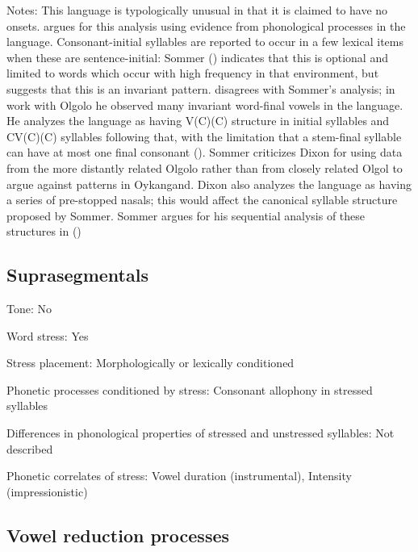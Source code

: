 {\begin{appendixdesc}
\item[Notes:] This language is typologically unusual in that it is claimed to have no onsets. \citet{Sommer1970,Sommer1981} argues for this analysis using evidence from phonological processes in the language. Consonant-initial syllables are reported to occur in a few lexical items when these are sentence-initial: Sommer (\citeyear[16, 33]{Sommer1969}) indicates that this is optional and limited to words which occur with high frequency in that environment, but \citet{Sommer1981} suggests that this is an invariant pattern. \citet{Dixon1970} disagrees with Sommer’s analysis; in work with Olgolo he observed many invariant word-final vowels in the language. He analyzes the language as having V(C)(C) structure in initial syllables and CV(C)(C) syllables following that, with the limitation that a stem-final syllable can have at most one final consonant (\citeyear[274]{Dixon1970}). Sommer criticizes Dixon for using data from the more distantly related Olgolo rather than from closely related Olgol to argue against patterns in Oykangand. Dixon also analyzes the language as having a series of pre-stopped nasals; this would affect the canonical syllable structure proposed by Sommer. Sommer argues for his sequential analysis of these structures in (\citeyear[242 f1]{Sommer1981})
\end{appendixdesc}
\subsection*{Suprasegmentals}
\begin{appendixdesc}
\item[Tone:] No

\item[Word stress:] Yes

\item[Stress placement:] Morphologically or lexically conditioned

\item[Phonetic processes conditioned by stress:] Consonant allophony in stressed syllables

\item[Differences in phonological properties of stressed and unstressed syllables:] Not described

\item[Phonetic correlates of stress:] Vowel duration (instrumental), Intensity (impressionistic)
\end{appendixdesc}
\subsection*{Vowel reduction processes}
\begin{appendixdesc}


\end{appendixdesc}}
